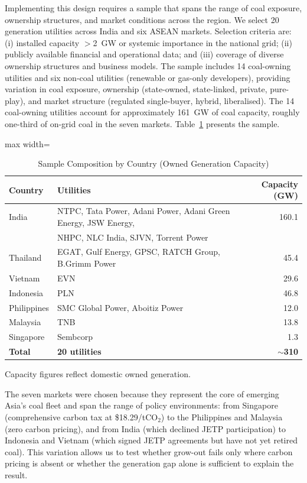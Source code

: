 \documentclass[review,3p,authoryear]{elsarticle}
\begin{document}
Implementing this design requires a sample that spans the range of coal exposure, ownership structures, and market conditions across the region. We select 20 generation utilities across India and six ASEAN markets. Selection criteria are: (i) installed capacity $>$2~GW or systemic importance in the national grid; (ii) publicly available financial and operational data; and (iii) coverage of diverse ownership structures and business models. The sample includes 14 coal-owning utilities and six non-coal utilities (renewable or gas-only developers), providing variation in coal exposure, ownership (state-owned, state-linked, private, pure-play), and market structure (regulated single-buyer, hybrid, liberalised). The 14 coal-owning utilities account for approximately 161~GW of coal capacity, roughly one-third of on-grid coal in the seven markets. Table~\ref{tab:sample} presents the sample.

\begin{table}[H]
\centering
\caption{Sample Composition by Country (Owned Generation Capacity)}
\label{tab:sample}
\small
\begin{adjustbox}{max width=\linewidth}
\begin{tabular}{@{}llr@{}}
\toprule
\textbf{Country} & \textbf{Utilities} & \textbf{Capacity (GW)} \\
\midrule
India & NTPC, Tata Power, Adani Power, Adani Green Energy, JSW Energy, & 160.1 \\
      & NHPC, NLC India, SJVN, Torrent Power & \\
Thailand & EGAT, Gulf Energy, GPSC, RATCH Group, B.Grimm Power & 45.4 \\
Vietnam & EVN & 29.6 \\
Indonesia & PLN & 46.8 \\
Philippines & SMC Global Power, Aboitiz Power & 12.0 \\
Malaysia & TNB & 13.8 \\
Singapore & Sembcorp & 1.3 \\
\midrule
\textbf{Total} & \textbf{20 utilities} & \textbf{$\sim$310} \\
\bottomrule
\end{tabular}
\end{adjustbox}
\begin{flushleft}
\footnotesize{Capacity figures reflect domestic owned generation.}
\end{flushleft}
\end{table}

The seven markets were chosen because they represent the core of emerging Asia's coal fleet and span the range of policy environments: from Singapore (comprehensive carbon tax at \$18.29/tCO$_2$) to the Philippines and Malaysia (zero carbon pricing), and from India (which declined JETP participation) to Indonesia and Vietnam (which signed JETP agreements but have not yet retired coal). This variation allows us to test whether grow-out fails only where carbon pricing is absent or whether the generation gap alone is sufficient to explain the result.
\end{document}
